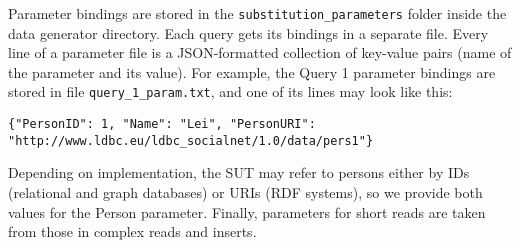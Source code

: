 Parameter bindings are stored in the \texttt{substitution\_parameters} folder
inside the data generator directory. Each query gets its bindings in a separate
file. Every line of a parameter file is a JSON-formatted collection of
key-value pairs (name of the parameter and its value). For example, the Query 1
parameter bindings are stored in file \texttt{query\_1\_param.txt}, and one of
its lines may look like this:

\begin{lstlisting}
{"PersonID": 1, "Name": "Lei", "PersonURI": "http://www.ldbc.eu/ldbc_socialnet/1.0/data/pers1"}
\end{lstlisting}

Depending on implementation, the SUT may refer to persons either by IDs
(relational and graph databases) or URIs (RDF systems), so we provide both
values for the Person parameter.  Finally, parameters for short reads are taken
from those in complex reads and inserts.
